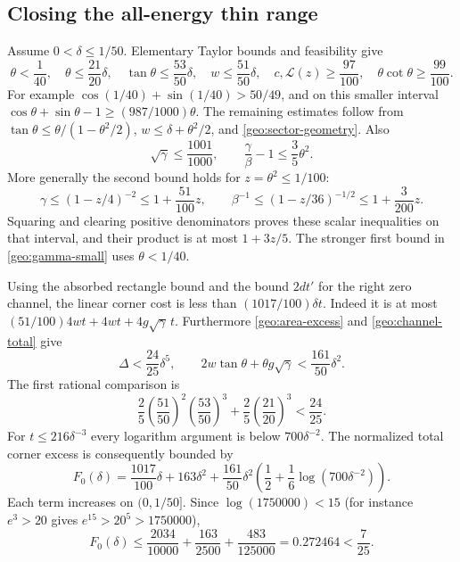 \documentclass[11pt,reqno]{amsart}
\numberwithin{equation}{section}
\begin{document}
\subsection{Closing the all-energy thin range}
\label{geo:thin-all}

Assume $0<\delta\le1/50$.  Elementary Taylor bounds and feasibility give
\begin{equation}\label{geo:very-thin-geometry}
 \theta<\frac1{40},\quad\theta\le\frac{21}{20}\delta,
 \quad\tan\theta\le\frac{53}{50}\delta,
 \quad w\le\frac{51}{50}\delta,
 \quad c,\mathcal L(z)\ge\frac{97}{100},
 \quad\theta\cot\theta\ge\frac{99}{100}.
\end{equation}
For example $\cos(1/40)+\sin(1/40)>50/49$, and on this smaller interval
$\cos\theta+\sin\theta-1\ge(987/1000)\theta$.
The remaining estimates follow from
$\tan\theta\le\theta/(1-\theta^2/2)$,
$w\le\delta+\theta^2/2$, and \eqref{geo:sector-geometry}.
Also
\begin{equation}\label{geo:gamma-small}
 \sqrt\gamma\le\frac{1001}{1000},\qquad
 \frac\gamma\beta-1\le\frac35\theta^2.
\end{equation}
More generally the second bound holds for $z=\theta^2\le1/100$:
\[
 \gamma\le(1-z/4)^{-2}\le1+\frac{51}{100}z,
 \qquad
 \beta^{-1}\le(1-z/36)^{-1/2}\le1+\frac3{200}z.
\]
Squaring and clearing positive denominators proves these scalar
inequalities on that interval, and their product is at most $1+3z/5$.
The stronger first bound in \eqref{geo:gamma-small} uses
$\theta<1/40$.

Using the absorbed rectangle bound and the bound $2dt'$ for the right
zero channel, the linear corner cost is less than
$(1017/100)\delta t$.  Indeed it is at most
$(51/100)4wt+4wt+4g\sqrt\gamma\,t$.
Furthermore \eqref{geo:area-excess} and \eqref{geo:channel-total} give
\[
 \Delta<\frac{24}{25}\delta^5,
 \qquad 2w\tan\theta+\theta g\sqrt\gamma
                                      <\frac{161}{50}\delta^2.
\]
The first rational comparison is
\[
 \frac25\left(\frac{51}{50}\right)^2
             \left(\frac{53}{50}\right)^3
       +\frac25\left(\frac{21}{20}\right)^3<\frac{24}{25}.
\]
For $t\le216\delta^{-3}$ every logarithm argument is below
$700\delta^{-2}$.  The normalized total corner excess is consequently
bounded by
\begin{equation}\label{geo:thin-error}
 F_0(\delta)=\frac{1017}{100}\delta+163\delta^2
  +\frac{161}{50}\delta^2
                 \left(\frac12+\frac16\log(700\delta^{-2})\right).
\end{equation}
Each term increases on $(0,1/50]$.  Since
$\log(1750000)<15$ (for instance $e^3>20$ gives
$e^{15}>20^5>1750000$),
\[
 F_0(\delta)\le\frac{2034}{10000}+\frac{163}{2500}
                        +\frac{483}{125000}
                   =0.272464<\frac7{25}.
\]
\end{document}
